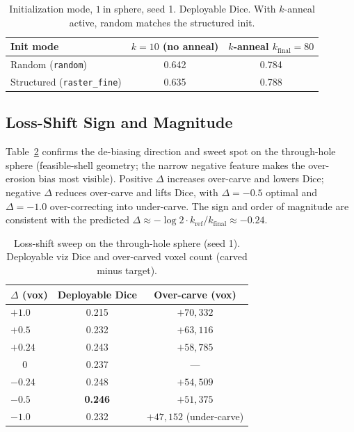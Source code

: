 \begin{table}[t]
  \centering
  \caption{Initialization mode, $1~\mathrm{in}$ sphere, seed 1. Deployable Dice. With $k$-anneal active, random matches the structured init.}
  \label{tab:init}
  \small
  \begin{tabular}{lcc}
    \toprule
    Init mode & $k{=}10$ (no anneal) & $k$-anneal $k_{\mathrm{final}}{=}80$ \\
    \midrule
    Random (\texttt{random})         & 0.642 & 0.784 \\
    Structured (\texttt{raster\_fine}) & 0.635 & 0.788 \\
    \bottomrule
  \end{tabular}
\end{table}


\subsection{Loss-Shift Sign and Magnitude}
\label{sec:lossshift-ablation}

Table~\ref{tab:lossshift} confirms the de-biasing direction and sweet spot on the
through-hole sphere (feasible-shell geometry; the narrow negative feature makes
the over-erosion bias most visible). Positive $\Delta$ increases over-carve and
lowers Dice; negative $\Delta$ reduces over-carve and lifts Dice, with
$\Delta{=}-0.5$ optimal and $\Delta{=}-1.0$ over-correcting into under-carve.
The sign and order of magnitude are consistent with the predicted
$\Delta \approx -\log 2 \cdot k_{\mathrm{ref}} / k_{\mathrm{final}} \approx -0.24$.

\begin{table}[t]
  \centering
  \caption{Loss-shift sweep on the through-hole sphere (seed 1). Deployable viz Dice and over-carved voxel count (carved minus target).}
  \label{tab:lossshift}
  \small
  \begin{tabular}{lcc}
    \toprule
    $\Delta$ (vox) & Deployable Dice & Over-carve (vox) \\
    \midrule
    $+1.0$  & 0.215 & $+70{,}332$ \\
    $+0.5$  & 0.232 & $+63{,}116$ \\
    $+0.24$ & 0.243 & $+58{,}785$ \\
    $\phantom{+}0$   & 0.237 & --- \\
    $-0.24$ & 0.248 & $+54{,}509$ \\
    $-0.5$  & \textbf{0.246} & $+51{,}375$ \\
    $-1.0$  & 0.232 & $+47{,}152$ (under-carve) \\
    \bottomrule
  \end{tabular}
\end{table}

